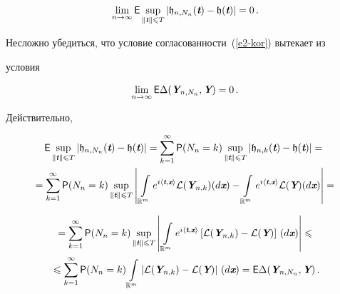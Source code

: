 \begin{equation}


\lim\limits_{n\to\infty}{\sf E}\sup\limits_{\|\vt\|\leqslant


T}\left\vert\mathfrak{h}_{n,N_n}(\vt)-\mathfrak{h}(\vt)\right\vert=0\,.


\label{e2-kor}


\end{equation}





Несложно убедиться, что условие согласованности~(\ref{e2-kor}) вытекает из


условия


$$


\lim\limits_{n\to\infty}{\sf E}\Delta(\vY_{n,N_n},\vY)=0\,.


$$


Действительно,


\begin{multline*}


{\sf E}\sup\limits_{\|\vt\|\leqslant


T}|\mathfrak{h}_{n,N_n}(\vt)-\mathfrak{h}(\vt)|=\sum\limits_{k=1}^{\infty}{\sf


P}(N_n=k)\sup_{\|\vt\|\leqslant


T}|\mathfrak{h}_{n,k}(\vt)-\mathfrak{h}(\vt)|={}


\\


{}=\sum\limits_{k=1}^{\infty}{\sf P}(N_n=k)\sup\limits_{\|\vt\|\leqslant


T}\left\vert\,\int\limits_{\mathbb{R}^m}^{}e^{i\langle


\vt,\vx\rangle}\mathcal{L}(\vY_{n,k})(d\vx)-\int\limits_{\mathbb{R}^m}^{}e^{i\langle


\vt,\vx\rangle}\mathcal{L}(\vY)(d\vx)\right\vert={}


\end{multline*}





\noindent


\begin{multline*}


{}=\sum\limits_{k=1}^{\infty}{\sf P}(N_n=k)\sup\limits_{\|\vt\|\leqslant


T}\left\vert\,\int\limits_{\mathbb{R}^m}^{}e^{i\langle


\vt,\vx\rangle}\left[\mathcal{L}(\vY_{n,k})-\mathcal{L}(\vY)\right]\,(d\vx)\right\vert


\leqslant


{}\\


{}\leqslant\sum\limits_{k=1}^{\infty}{\sf


P}(N_n=k)\int\limits_{\mathbb{R}^m}^{}\left\vert


\mathcal{L}(\vY_{n,k})-\mathcal{L}(\vY)\right\vert \,(d\vx)=


{\sf E}\Delta(\vY_{n,N_n},\vY)\,.


\end{multline*}





